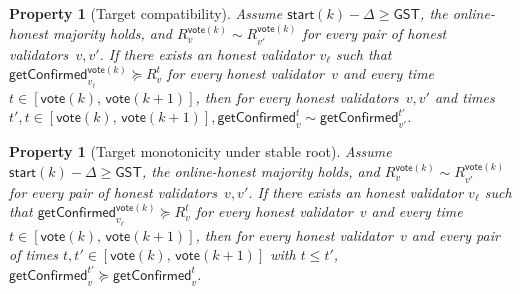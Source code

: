 \documentclass{article}
\newcommand{\start}{\mathsf{start}}
\newcommand{\vote}{\mathsf{vote}}
\newcommand{\getConfirmed}{\textsf{getConfirmed}\xspace}
\theoremstyle{plain}
\newtheorem{property}[theorem]{Property}
\theoremstyle{definition}
\theoremstyle{remark}
\newcommand{\GST}{\ensuremath{\mathsf{GST}}}
\newcommand{\OHM}{online-honest majority\xspace}
\begin{document}
\begin{property}[Target compatibility]\label{rev:prop:getConfirmed-compat}
Assume $\start(k) - \Delta \geq \GST$, the \OHM holds, and $R_v^{\vote(k)} \sim R_{v'}^{\vote(k)}$ for every pair of honest validators~$v, v'$.
If there exists an honest validator $v_\ell$ such that $\getConfirmed_{v_\ell}^{\vote(k)} \succeq R_{v}^t$ for every honest validator~$v$ and every time $t \in [\vote(k),\, \vote(k+1)]$, then for every honest validators~$v,v'$ and times $t',t \in [\vote(k),\, \vote(k+1)], \getConfirmed_v^{t} \sim \getConfirmed_{v'}^{t'}$.
\end{property}

\begin{property}[Target monotonicity under stable root]\label{rev:prop:target-monotonicity}
Assume $\start(k) - \Delta \geq \GST$, the \OHM holds, and $R_v^{\vote(k)} \sim R_{v'}^{\vote(k)}$ for every pair of honest validators~$v, v'$.
If there exists an honest validator $v_\ell$ such that $\getConfirmed_{v_\ell}^{\vote(k)} \succeq R_{v}^t$ for every honest validator~$v$ and every time $t \in [\vote(k),\, \vote(k+1)]$, then for every honest validator~$v$ and every pair of times $t, t' \in [\vote(k),\, \vote(k+1)]$ with $t \leq t'$, $\getConfirmed_v^{t'} \succeq \getConfirmed_v^t$.
\end{property}
\end{document}
